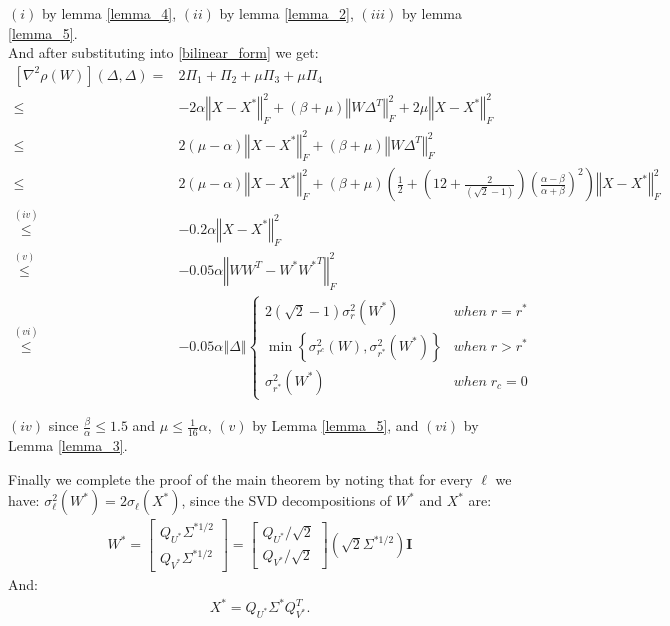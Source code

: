 \documentclass{article}
\begin{document}
$\left(i\right)$ by lemma \ref{lemma_4}, $\left(ii\right)$ by lemma \ref{lemma_2}, $\left(iii\right)$ by lemma \ref{lemma_5}. \\

And after substituting into \ref{bilinear_form} we get:
\begin{align*}
    \left[\nabla^2\rho\left(W\right)\right]\left(\Delta,\Delta\right)= & 2\Pi_1 + \Pi_2 + \mu\Pi_3 + \mu\Pi_4 \\
    \le & -2\alpha\left\Vert X-X^*\right\Vert^2_F + \left(\beta+\mu\right)\left\Vert W\Delta^T\right\Vert^2_F + 2\mu\left\Vert X-X^*\right\Vert^2_F \\
    \le & 2\left(\mu-\alpha\right)\left\Vert X-X^*\right\Vert^2_F + \left(\beta+\mu\right)\left\Vert W\Delta^T\right\Vert^2_F \\
    \le & 2\left(\mu-\alpha\right)\left\Vert X-X^*\right\Vert^2_F + \left(\beta+\mu\right)\left(\frac{1}{2} + \left(12 + \frac{2}{\left(\sqrt{2}- 1\right)}\right)\left(\frac{\alpha - \beta}{\alpha + \beta}\right)^2\right)\left\Vert X-X^*\right\Vert_F^2 \\
    \overset{\left(iv\right)}{\le} & -0.2\alpha\left\Vert X-X^*\right\Vert_F^2 \\
    \overset{\left(v\right)}{\le} & -0.05\alpha\left\Vert WW^T-W^*{W^*}^T\right\Vert^2_F \\
    \overset{\left(vi\right)}{\le} & -0.05\alpha\left\Vert\Delta\right\Vert\begin{cases}
2\left(\sqrt{2}-1\right)\sigma^2_r\left(W^{*}\right) & when\;r=r^{*}\\
\min\left\{ \sigma^2_{r^c}\left(W\right),\sigma^2_{r^*}\left(W^{*}\right)\right\}  & when\;r > r^{*}\\
\sigma^2_{r^*}\left(W^{*}\right) & when\;r_c=0
\end{cases}
\end{align*}

$\left(iv\right)$ since $\frac{\beta}{\alpha}\le1.5$ and $\mu\le \frac{1}{16}\alpha$, $\left(v\right)$ by Lemma \ref{lemma_5}, and $\left(vi\right)$ by Lemma \ref{lemma_3}.

Finally we complete the proof of the main theorem by noting that for every $\ell$ we have: $\sigma^2_{\ell}\left(W^{*}\right) = 2\sigma_{\ell}\left(X^{*}\right)$, since the SVD decompositions of $W^*$ and $X^*$ are:
\begin{align*}
    W^*=\left[\begin{array}{c}
Q_{U^{*}}\Sigma^{*1/2}\\
Q_{V^{*}}\Sigma^{*1/2}
\end{array}\right]=\left[\begin{array}{c}
Q_{U^{*}}/\sqrt{2}\\
Q_{V^{*}}/\sqrt{2}
\end{array}\right]\left(\sqrt{2}\Sigma^{*1/2}\right)\boldsymbol{I}
\end{align*}
And:
\begin{align*}
    X^*=Q_{U^{*}}\Sigma^{*}Q_{V^{*}}^T.
\end{align*}
\end{document}
